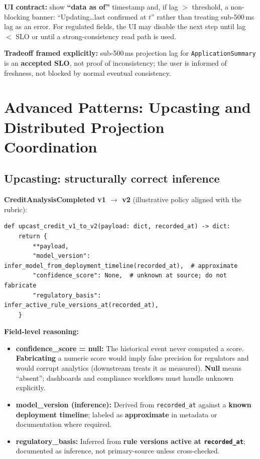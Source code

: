 \documentclass[11pt,a4paper]{article}
\begin{document}
\textbf{UI contract:} show \textbf{``data as of''} timestamp and, if lag $>$ threshold, a non-blocking banner: ``Updating\ldots last confirmed at $t$'' rather than treating sub-500\,ms lag as an error. For regulated fields, the UI may disable the next step until lag $<$ SLO or until a strong-consistency read path is used.

\textbf{Tradeoff framed explicitly:} sub-500\,ms projection lag for \texttt{ApplicationSummary} is an \textbf{accepted SLO}, not proof of inconsistency; the user is informed of freshness, not blocked by normal eventual consistency.

\section{Advanced Patterns: Upcasting and Distributed Projection Coordination}

\subsection{Upcasting: structurally correct inference}

\textbf{CreditAnalysisCompleted v1 $\rightarrow$ v2} (illustrative policy aligned with the rubric):

\begin{verbatim}
def upcast_credit_v1_to_v2(payload: dict, recorded_at) -> dict:
    return {
        **payload,
        "model_version": infer_model_from_deployment_timeline(recorded_at),  # approximate
        "confidence_score": None,  # unknown at source; do not fabricate
        "regulatory_basis": infer_active_rule_versions_at(recorded_at),
    }
\end{verbatim}

\textbf{Field-level reasoning:}
\begin{itemize}[leftmargin=*]
  \item \textbf{confidence\_score = null:} The historical event never computed a score. \textbf{Fabricating} a numeric score would imply false precision for regulators and would corrupt analytics (downstream treats it as measured). \textbf{Null} means ``absent''; dashboards and compliance workflows must handle unknown explicitly.
  \item \textbf{model\_version (inference):} Derived from \texttt{recorded\_at} against a \textbf{known deployment timeline}; labeled as \textbf{approximate} in metadata or documentation where required.
  \item \textbf{regulatory\_basis:} Inferred from \textbf{rule versions active at \texttt{recorded\_at}}; documented as inference, not primary-source unless cross-checked.
\end{itemize}
\end{document}
